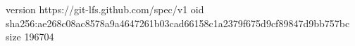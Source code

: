 version https://git-lfs.github.com/spec/v1
oid sha256:ae268c08ac8578a9a4647261b03cad66158c1a2379f675d9cf89847d9bb757bc
size 196704
